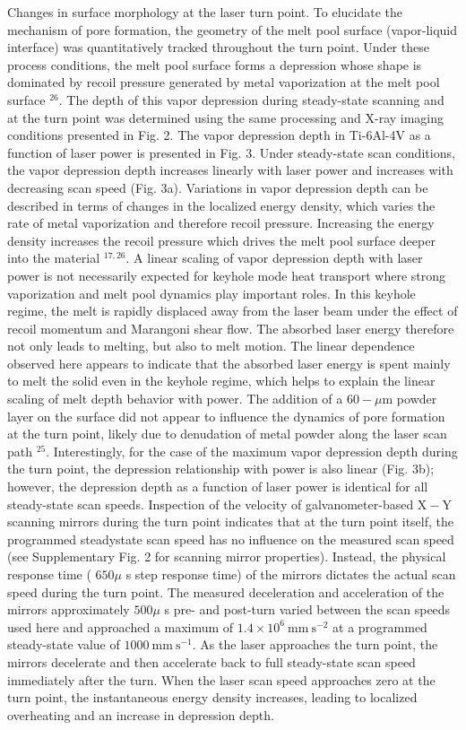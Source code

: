 \documentclass[10pt]{article}
\begin{document}
Changes in surface morphology at the laser turn point. To elucidate the mechanism of pore formation, the geometry of the melt pool surface (vapor-liquid interface) was quantitatively tracked throughout the turn point. Under these process conditions, the melt pool surface forms a depression whose shape is dominated by recoil pressure generated by metal vaporization at the melt pool surface ${ }^{26}$. The depth of this vapor depression during steady-state scanning and at the turn point was determined using the same processing and X-ray imaging conditions presented in Fig. 2. The vapor depression depth in Ti-6Al-4V as a function of laser power is presented in Fig. 3. Under steady-state scan conditions, the vapor depression depth increases linearly with laser power and increases with decreasing scan speed (Fig. 3a). Variations in vapor depression depth can be described in terms of changes in the localized energy density, which varies the rate of metal vaporization and therefore recoil pressure. Increasing the energy density increases the recoil pressure which drives the melt pool surface deeper into the material ${ }^{17,26}$. A linear scaling of vapor depression depth with laser power is not necessarily expected for keyhole mode heat transport where strong vaporization and melt pool dynamics play important roles. In this keyhole regime, the melt is rapidly displaced away from the laser beam under the effect of recoil momentum and Marangoni shear flow. The absorbed laser energy therefore not only leads to melting, but also to melt motion. The linear dependence observed here appears to indicate that the absorbed laser energy is spent mainly to melt the solid even in the keyhole regime, which helps to explain the linear scaling of melt depth behavior with power. The addition of a $60-\mu \mathrm{m}$ powder layer on the surface did not appear to influence the dynamics of pore formation at the turn point, likely due to denudation of metal powder along the laser scan path ${ }^{25}$. Interestingly, for the case of the maximum vapor depression depth during the turn point, the depression relationship with power is also linear (Fig. 3b); however, the depression depth as a function of laser power is identical for all steady-state scan speeds. Inspection of the velocity of galvanometer-based $\mathrm{X}-\mathrm{Y}$ scanning mirrors during the turn point indicates that at the turn point itself, the programmed steadystate scan speed has no influence on the measured scan speed (see Supplementary Fig. 2 for scanning mirror properties). Instead, the physical response time ( $650 \mu$ s step response time) of the mirrors dictates the actual scan speed during the turn point. The measured deceleration and acceleration of the mirrors approximately $500 \mu$ s pre- and post-turn varied between the scan speeds used here and approached a maximum of $1.4 \times 10^{6} \mathrm{~mm} \mathrm{~s}^{-2}$ at a programmed steady-state value of $1000 \mathrm{~mm} \mathrm{~s}^{-1}$. As the laser approaches the turn point, the mirrors decelerate and then accelerate back to full steady-state scan speed immediately after the turn. When the laser scan speed approaches zero at the turn point, the instantaneous energy density increases, leading to localized overheating and an increase in depression depth.
\end{document}
